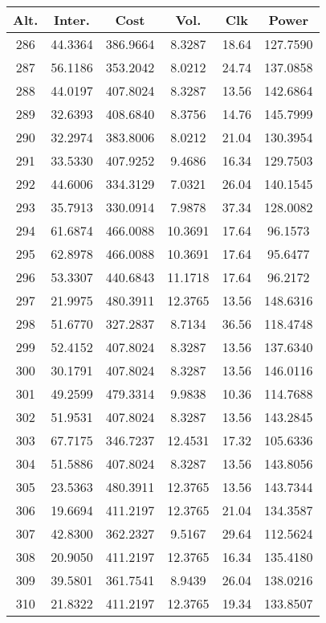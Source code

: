 \begin{center}
\begin{footnotesize}
\begin{tabular}{|c|ccccc|}
\hline
Alt. & Inter. & Cost & Vol. & Clk & Power\\
\hline
286 & 44.3364 & 386.9664 & 8.3287 & 18.64 & 127.7590 \\
287 & 56.1186 & 353.2042 & 8.0212 & 24.74 & 137.0858 \\
288 & 44.0197 & 407.8024 & 8.3287 & 13.56 & 142.6864 \\
289 & 32.6393 & 408.6840 & 8.3756 & 14.76 & 145.7999 \\
290 & 32.2974 & 383.8006 & 8.0212 & 21.04 & 130.3954 \\
291 & 33.5330 & 407.9252 & 9.4686 & 16.34 & 129.7503 \\
292 & 44.6006 & 334.3129 & 7.0321 & 26.04 & 140.1545 \\
293 & 35.7913 & 330.0914 & 7.9878 & 37.34 & 128.0082 \\
294 & 61.6874 & 466.0088 & 10.3691 & 17.64 & 96.1573 \\
295 & 62.8978 & 466.0088 & 10.3691 & 17.64 & 95.6477 \\
296 & 53.3307 & 440.6843 & 11.1718 & 17.64 & 96.2172 \\
297 & 21.9975 & 480.3911 & 12.3765 & 13.56 & 148.6316 \\
298 & 51.6770 & 327.2837 & 8.7134 & 36.56 & 118.4748 \\
299 & 52.4152 & 407.8024 & 8.3287 & 13.56 & 137.6340 \\
300 & 30.1791 & 407.8024 & 8.3287 & 13.56 & 146.0116 \\
301 & 49.2599 & 479.3314 & 9.9838 & 10.36 & 114.7688 \\
302 & 51.9531 & 407.8024 & 8.3287 & 13.56 & 143.2845 \\
303 & 67.7175 & 346.7237 & 12.4531 & 17.32 & 105.6336 \\
304 & 51.5886 & 407.8024 & 8.3287 & 13.56 & 143.8056 \\
305 & 23.5363 & 480.3911 & 12.3765 & 13.56 & 143.7344 \\
306 & 19.6694 & 411.2197 & 12.3765 & 21.04 & 134.3587 \\
307 & 42.8300 & 362.2327 & 9.5167 & 29.64 & 112.5624 \\
308 & 20.9050 & 411.2197 & 12.3765 & 16.34 & 135.4180 \\
309 & 39.5801 & 361.7541 & 8.9439 & 26.04 & 138.0216 \\
310 & 21.8322 & 411.2197 & 12.3765 & 19.34 & 133.8507 \\

\end{tabular}
\end{footnotesize}
\end{center}
